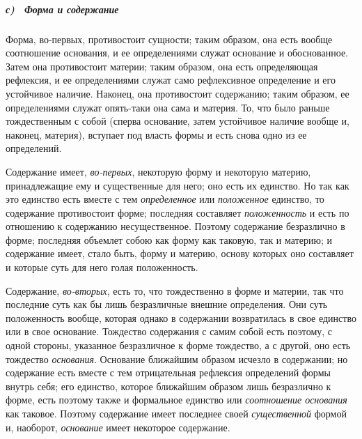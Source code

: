\subparagraph[с) \ Форма и содержание]{с) \ Форма и содержание}
Форма, во-первых, противостоит сущности; таким
образом, она есть вообще соотношение основания, и ее определениями служат
основание и обоснованное. Затем она противостоит материи; таким образом,
она есть определяющая рефлексия, и ее определениями служат само
рефлексивное определение и его устойчивое наличие. Наконец, она
противостоит содержанию; таким образом, ее определениями служат опять-таки
она сама и материя. То, что было раньше тождественным с собой (сперва
основание, затем устойчивое наличие вообще и, наконец, материя), вступает
под власть формы и есть снова одно из ее определений.

Содержание имеет, {\em во-первых}, некоторую форму и
некоторую материю, принадлежащие ему и существенные для него; оно есть их
единство. Но так как это единство есть вместе с тем
{\em определенное} или
{\em положенное} единство, то содержание противостоит
форме; последняя составляет {\em положенность} и есть
по отношению к содержанию несущественное. Поэтому содержание безразлично в
форме; последняя объемлет собою как форму как таковую, так и материю; и
содержание имеет, стало быть, форму и материю, основу которых оно
составляет и которые суть для него голая положенность.

Содержание, {\em во-вторых}, есть то, что тождественно в
форме и материи, так что последние суть как бы лишь безразличные внешние
определения. Они суть положенность вообще, которая однако в содержании
возвратилась в свое единство или в свое основание. Тождество содержания с
самим собой есть поэтому, с одной стороны, указанное безразличное к форме
тождество, а с другой, оно есть тождество
{\em основания}. Основание ближайшим образом исчезло в
содержании; но содержание есть вместе с тем отрицательная рефлексия
определений формы внутрь себя; его единство, которое ближайшим образом лишь
безразлично к форме, есть поэтому также и формальное единство или
{\em соотношение основания} как таковое. Поэтому
содержание имеет последнее своей {\em существенной}
формой и, наоборот, {\em основание} имеет некоторое
содержание.

